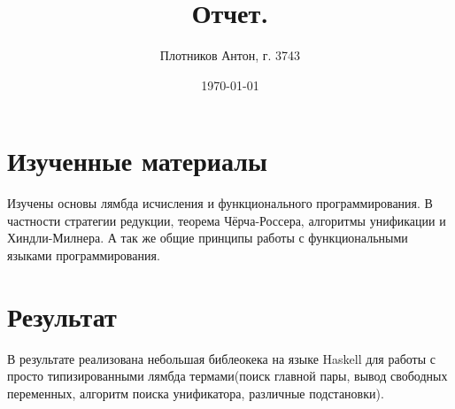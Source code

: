 \documentclass[a4paper,12pt]{article}
\author{Плотников Антон, г. 3743}
\title{Отчет.}
\date{\today}
\begin{document}
\maketitle

\section*{Изученные материалы}
Изучены основы лямбда исчисления и функционального программирования. В частности стратегии редукции, теорема Чёрча-Россера, алгоритмы унификации и Хиндли-Милнера. А так же общие принципы работы с функциональными языками программирования.

\section*{Результат}
В результате реализована небольшая библеокека на языке Haskell для работы с просто типизированными лямбда термами(поиск главной пары, вывод свободных переменных, алгоритм поиска унификатора, различные подстановки). 
\end{document}
